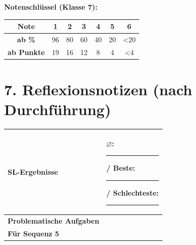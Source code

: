 \documentclass[11pt, a4paper]{article}
\begin{document}
\vspace{1em}

\textbf{Notenschlüssel (Klasse 7):}

\begin{tabular}{|c|c|c|c|c|c|c|}
\hline
\textbf{Note} & 1 & 2 & 3 & 4 & 5 & 6 \\
\hline
\textbf{ab \%} & 96 & 80 & 60 & 40 & 20 & <20 \\
\hline
\textbf{ab Punkte} & 19 & 16 & 12 & 8 & 4 & <4 \\
\hline
\end{tabular}

\section*{7. Reflexionsnotizen (nach Durchführung)}

\begin{tabularx}{\textwidth}{|l|X|}
\hline
\textbf{SL-Ergebnisse} & $\varnothing$: \rule{2cm}{0.4pt} / Beste: \rule{1cm}{0.4pt} / Schlechteste: \rule{1cm}{0.4pt} \\[1.5em]
\hline
\textbf{Problematische Aufgaben} & \\[2em]
\hline
\textbf{Für Sequenz 5} & \\[2em]
\hline
\end{tabularx}
\end{document}
